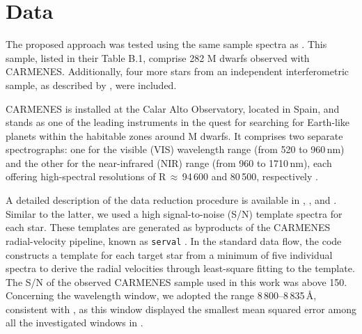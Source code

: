 


\section{Data} \label{acs_sec:data}

The proposed approach was tested using the same sample spectra as . This sample, listed in their Table B.1, comprise 282 M dwarfs observed with CARMENES. Additionally, four more stars from an independent interferometric sample, as described by , were included.

CARMENES is installed at the Calar Alto Observatory, located in Spain, and stands as one of the leading instruments in the quest for searching for Earth-like planets within the habitable zones around M dwarfs. It comprises two separate spectrographs: one for the visible (VIS) wavelength range (from 520 to 960\,nm) and the other for the near-infrared (NIR) range (from 960 to 1710\,nm), each offering high-spectral resolutions of R\,$\approx$\,94\,600 and 80\,500, respectively \citep{Quirrenbach20,reiners2018}.

A detailed description of the data reduction procedure is available in \citet{Zechmeister14}, \citet{Caballero2016}, and .
Similar to the latter, we used a high signal-to-noise (S/N) template spectra for each star. These templates are generated as byproducts of the CARMENES radial-velocity pipeline, known as {\tt serval}
\citep[SpEctrum Radial Velocity AnaLyser;][]{Zechmeister2018}. In the standard data flow, the code constructs a template for each target star from a minimum of five individual spectra to derive the radial velocities through least-square fitting to the template.
The S/N of the observed CARMENES sample used in this work was above 150. Concerning the wavelength window, we adopted the range 8\,800--8\,835\,\AA, consistent with , as this window displayed the smallest mean squared error among all the investigated windows in .

